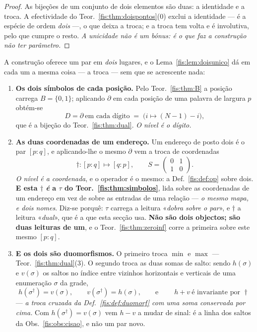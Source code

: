 \documentclass[livro.tex]{subfiles}
\begin{document}
\begin{proof}
As bijeções de um conjunto de dois elementos são duas: a identidade e a troca. A
efectividade do Teor.~\ref{fis:thm:doispontos}(0) exclui a identidade --- é a
espécie de ordem \emph{dois} ---, o que deixa a troca; e a troca tem volta e é
involutiva, pelo que cumpre o resto. \emph{A unicidade não é um bónus: é o que faz
a construção não ter parâmetro.}
\end{proof}

\begin{teorema}\label{fis:thm:constroi}
A construção oferece um par em \emph{dois} lugares, e o Lema~\ref{fis:lem:doisunico}
dá em cada um a mesma coisa --- a troca --- sem que se acrescente nada:
\begin{enumerate}\itemsep3pt
\item[(1)] \textbf{Os dois símbolos de cada posição.} Pelo
Teor.~\ref{fis:thm:B} a posição carrega $B=\{0,1\}$; aplicando $\partial$ em cada
posição de uma palavra de largura $p$ obtém-se
\[
D=\partial\ \text{em cada dígito}\;=\;\bigl(i\mapsto(N-1)-i\bigr) ,
\]
que é a bijeção do Teor.~\ref{fis:thm:dual}. \emph{O nível é o dígito.}
\item[(2)] \textbf{As duas coordenadas de um endereço.} Um endereço de posto
dois é o par $[p{:}q]$, e aplicando-lhe o mesmo $\partial$ vem a troca de
coordenadas
\[
\dagger\colon[p{:}q]\mapsto[q{:}p],
\qquad
S=\begin{pmatrix}0&1\\1&0\end{pmatrix} .
\]
\emph{O nível é a coordenada}, e o operador é o mesmo: a Def.~\ref{fis:def:op}
sobre dois. \textbf{E esta $\dagger$ \emph{é} a $\tau$ do
Teor.~\ref{fis:thm:simbolos}}, lida sobre as coordenadas de um endereço em vez de
sobre as entradas de uma relação --- \emph{o mesmo mapa, e dois nomes}. Diz-se
porquê: $\tau$ carrega a leitura «\emph{dobra sobre o par}», e $\dagger$ a leitura
«\emph{dual}», que é a que esta secção usa. \textbf{Não são dois objectos; são duas
leituras de um}, e o Teor.~\ref{fis:thm:zeroinf} corre a primeira sobre este mesmo
$[p{:}q]$.
\item[(3)] \textbf{E os dois são duomorfismos.} O primeiro troca $\min$ e $\max$
--- Teor.~\ref{fis:thm:dual}(3). O segundo troca as duas somas de salto: sendo
$h(\sigma)$ e $v(\sigma)$ os saltos no índice entre vizinhos horizontais e
verticais de uma enumeração $\sigma$ da grade,
\[
h(\sigma^{\dagger})=v(\sigma),
\qquad
v(\sigma^{\dagger})=h(\sigma),
\qquad\text{e}\qquad
\boxed{\;h+v\ \text{é invariante por }\dagger\;}
\]
--- \emph{a troca cruzada da Def.~\ref{fis:def:duomorf} com uma soma conservada
por cima.} Com $h(\sigma^{\dagger})=v(\sigma)$ vem $h-v$ a mudar de sinal: é a
linha dos saltos da Obs.~\ref{fis:obs:cisao}, e não um par novo.


\end{enumerate}
\end{teorema}
\end{document}
